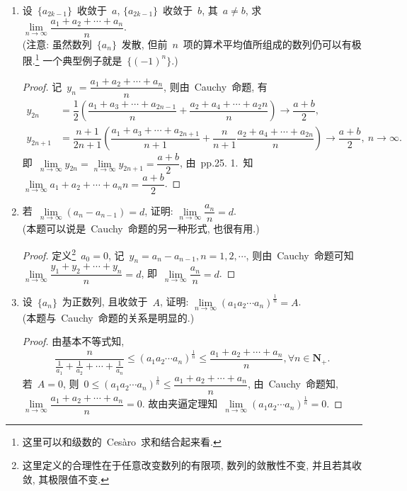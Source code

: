 \documentclass[UTF8,a4paper,10pt,twoside]{book}
\begin{document}
\begin{enumerate}
\begin{proof}
	      \end{proof}
	\item 设~$\{a_{2k-1}\}$~收敛于~$a$, $\{a_{2k-1}\}$~收敛于~$b$, 其~$a\neq b$, 求~$\lim\limits_{n\to\infty} \dfrac{a_1+a_2+\cdots+a_n}{n}$.\\
	      (注意: 虽然数列~$\{a_n\}$~发散, 但前~$n$~项的算术平均值所组成的数列仍可以有极限.\footnote{这里可以和级数的~Ces\`aro~求和结合起来看.} 一个典型例子就是~$\{(-1)^n\}$.)
	      \begin{proof}
		      记~$y_n=\dfrac{a_1+a_2+\cdots+a_n}{n}$, 则由~Cauchy~命题, 有
		      \begin{equation*}
			      \begin{split}
				      y_{2n}&=\dfrac{1}{2}\left(\dfrac{a_1+a_3+\cdots+a_{2n-1}}{n}+\dfrac{a_2+a_4+\cdots+a_2n}{n}\right)\to\dfrac{a+b}{2},\\
				      y_{2n+1}&=\dfrac{n+1}{2n+1}\left(\dfrac{a_1+a_3+\cdots+a_{2n+1}}{n+1}+\dfrac{n}{n+1}\dfrac{a_2+a_4+\cdots+a_{2n}}{n}\right)\to\dfrac{a+b}{2},\ n\to\infty.
			      \end{split}
		      \end{equation*}
		      即~$\lim\limits_{n\to\infty} y_{2n}=\lim\limits_{n\to\infty} y_{2n+1}=\dfrac{a+b}{2}$, 由~pp.25. 1.~知~$\lim\limits_{n\to\infty} {a_1+a_2+\cdots+a_n}{n}=\dfrac{a+b}{2}$.\qedhere
	      \end{proof}
	\item 若~$\lim\limits_{n\to\infty} (a_n-a_{n-1})=d$, 证明: $\lim\limits_{n\to\infty} \dfrac{a_n}{n}=d$.\\
	      (本题可以说是~Cauchy~命题的另一种形式, 也很有用.)
	      \begin{proof}
		      定义\footnote{这里定义的合理性在于任意改变数列的有限项, 数列的敛散性不变, 并且若其收敛, 其极限值不变.}~$a_0=0$, 记~$y_n=a_n-a_{n-1}, n=1,2,\cdots$, 则由~Cauchy~命题可知~$\lim\limits_{n\to\infty} \dfrac{y_1+y_2+\cdots+y_n}{n}=d$, 即~$\lim\limits_{n\to\infty} \dfrac{a_n}{n}=d$.\qedhere
	      \end{proof}
	\item 设~$\{a_n\}$~为正数列, 且收敛于~$A$, 证明: $\lim\limits_{n\to\infty} (a_1a_2\cdots a_n)^\frac{1}{n}=A$.\\
	      (本题与~Cauchy~命题的关系是明显的.)
	      \begin{proof}
		      由基本不等式知,
		      \[
			      \dfrac{n}{\frac{1}{a_1}+\frac{1}{a_2}+\cdots+\frac{1}{a_n}}\leqslant(a_1a_2\cdots a_n)^{\frac{1}{n}}\leqslant\dfrac{a_1+a_2+\cdots+a_n}{n}, \forall n\in\mathbf{N}_{+}.
		      \]
		      若~$A=0$, 则~$0\leqslant(a_1a_2\cdots a_n)^{\frac{1}{n}}\leqslant\dfrac{a_1+a_2+\cdots+a_n}{n}$, 由~Cauchy~命题知, $\lim\limits_{n\to\infty} \dfrac{a_1+a_2+\cdots+a_n}{n}=0$. 故由夹逼定理知~$\lim\limits_{n\to\infty} (a_1a_2\cdots a_n)^\frac{1}{n}=0$.


\end{proof}
\end{enumerate}
\end{document}

